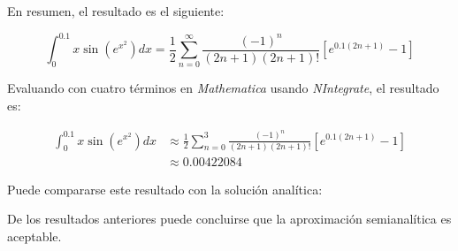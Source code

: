 \begin{ex}
\begin{solution}
	En resumen, el resultado es el siguiente:

	\begin{equation*}
		\int_{0}^{0.1} x \sin(e^{x^2}) dx = \frac{1}{2} \sum_{n = 0}^{\infty} \frac{(-1)^n}{(2n + 1)(2n + 1)!} \left[e^{0.1(2n + 1)} - 1 \right]
	\end{equation*}



	Evaluando con cuatro términos en
	\emph{Mathematica} usando \emph{NIntegrate}, el resultado es:

	\begin{align*}
		\int_{0}^{0.1} x \sin(e^{x^2}) dx &\approx \frac{1}{2} \sum_{n = 0}^{3} \frac{(-1)^n}{(2n + 1)(2n + 1)!} \left[e^{0.1(2n + 1)} - 1 \right]\\
						  &\approx 0.00422084
	\end{align*}

	Puede compararse este resultado con la solución analítica:

	\begin{center}
	\end{center}

	De los resultados anteriores puede concluirse que la aproximación
	semianalítica es aceptable.
	\end{solution}

\end{ex}


